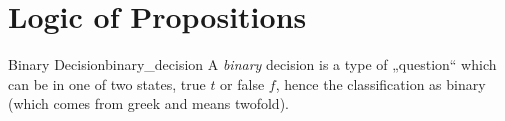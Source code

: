 \section{Logic of Propositions}\label{sec:logic}

\begin{definition}{Binary Decision}{binary_decision}
    A \textit{binary} decision is a type of „question“ which can be in one of 
    two states, true $t$ or false $f$, hence the classification as 
    binary (which comes from greek and means twofold).
\end{definition}